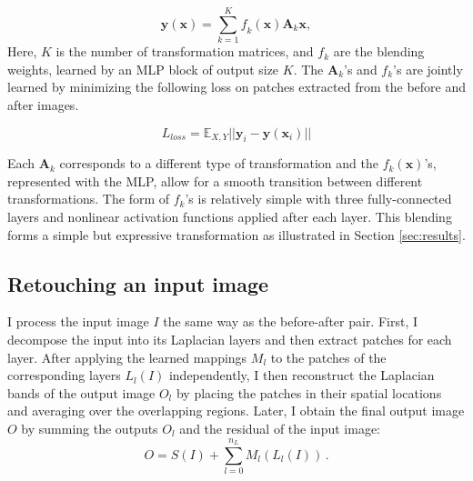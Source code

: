 \begin{equation} 
	\mathbf{y} (\mathbf{x}) = \sum_{k=1}^K
	\mathit{f}_k (\mathbf{x}) \mathbf{A}_k \mathbf{x},
	\label{eq:weightedSum}
\end{equation} 
Here, $K$ is the number of transformation matrices, and $f_k$ are the blending weights, learned by an MLP block of output size $K$. The $\mathbf{A}_k$'s and $f_k$'s are jointly learned by minimizing the following loss on patches extracted from the before and after images.

\begin{equation}
    L_{loss}  = \mathbb{E}_{X, Y} || \mathbf{y}_i -   \mathbf{y} (\mathbf{x}_i) ||
\end{equation}

Each $\mathbf{A}_k$ corresponds to a different type of transformation and the $f_k(\mathbf{x})$'s, represented with the MLP, allow for a smooth transition between different transformations. The form of $f_k$'s is relatively simple with three fully-connected layers and nonlinear activation functions applied after each layer. This blending forms a simple but expressive transformation as illustrated in Section \ref{sec:results}.

\subsection{Retouching an input image}

I process the input image $I$ the same way as the before-after pair. First, I decompose the input into its Laplacian layers and then extract patches for each layer. After applying the learned mappings $M_l$ to the patches of the corresponding layers $L_{l}(I)$ independently, I then reconstruct the Laplacian bands of the output image $O_l$ by placing the patches in their spatial locations and averaging over the overlapping regions. Later, I obtain the final output image $O$ by summing the outputs $O_l$ and the residual of the input image:
\begin{equation}
    O = S(I) + \sum_{l=0}^{n_L} M_l(L_l(I))\,.
\end{equation}
